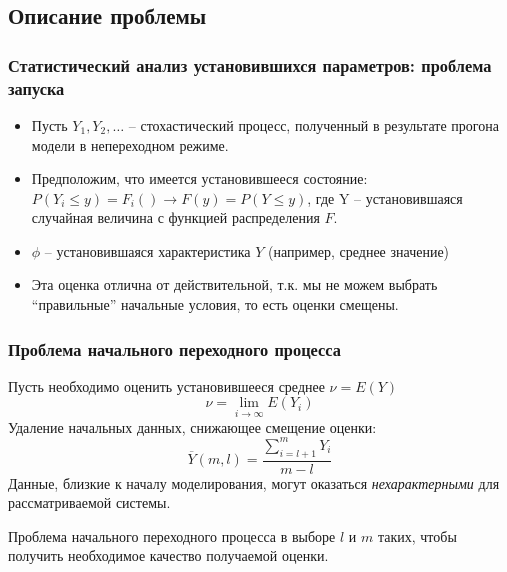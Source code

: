\documentclass[utf8]{beamer}
\begin{document}
\subsection{Описание проблемы}
\begin{frame}
\frametitle{Статистический анализ установившихся параметров: проблема
запуска}
\begin{itemize}
  \item Пусть $Y_1, Y_2, \ldots$ -- стохастический процесс, полученный в
результате прогона модели в непереходном режиме.
  \item Предположим, что имеется установившееся состояние: $P(Y_i \leq
  y) = F_i() \rightarrow F(y) = P(Y\leq y)$, где Y -- установившаяся
  случайная величина с функцией распределения $F$.
  \item $\phi$ -- установившаяся характеристика $Y$ (например, среднее
  значение)
  \item Эта оценка отлична от действительной, т.к. мы не можем выбрать
  ``правильные'' начальные условия, то есть оценки смещены.
\end{itemize}

\end{frame}
\begin{frame}
\frametitle{Проблема начального переходного процесса}
Пусть необходимо оценить установившееся среднее $\nu = E(Y)$
$$
\nu = \lim_{i \rightarrow \infty} E(Y_i)
$$
Удаление начальных данных, снижающее смещение оценки:
$$
\overline{Y}(m, l) = \frac
                          {\sum_{i=l+1}^{m}Y_i}
                          {m-l}
$$
Данные, близкие к началу моделирования, могут оказаться
\emph{нехарактерными} для рассматриваемой системы.

Проблема начального переходного процесса в выборе $l$ и $m$ таких, чтобы получить необходимое качество получаемой оценки.
\end{frame}
\end{document}
